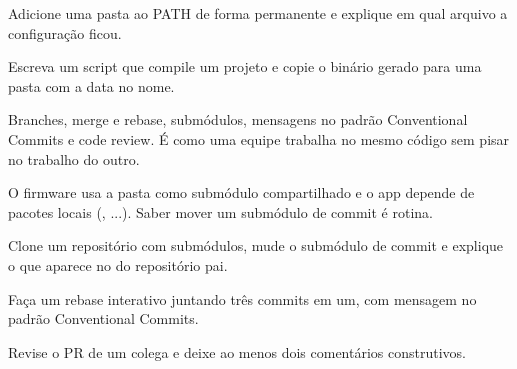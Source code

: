 \begin{paraestudar}
  \item {}
  \item {}
\end{paraestudar}

\begin{pratique}
  \item Adicione uma pasta ao PATH de forma permanente e explique em qual arquivo a configuração ficou.
  \item Escreva um script que compile um projeto e copie o binário gerado para uma pasta com a data no nome.
\end{pratique}

Branches, merge e rebase, submódulos, mensagens no padrão Conventional Commits e code review. É como uma equipe trabalha no mesmo código sem pisar no trabalho do outro.

\begin{noproduto}
O firmware usa a pasta  como submódulo compartilhado e o app depende de pacotes locais (, ...). Saber mover um submódulo de commit é rotina.
\end{noproduto}

\begin{paraestudar}
  \item {}
  \item {}
  \item {}
\end{paraestudar}

\begin{pratique}
  \item Clone um repositório com submódulos, mude o submódulo de commit e explique o que aparece no   do repositório pai.
  \item Faça um rebase interativo juntando três commits em um, com mensagem no padrão Conventional Commits.
  \item Revise o PR de um colega e deixe ao menos dois comentários construtivos.
\end{pratique}

